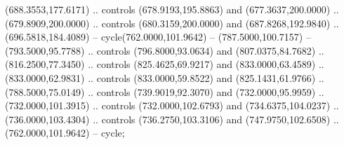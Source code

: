 (688.3553,177.6171) .. controls (678.9193,195.8863) and (677.3637,200.0000) .. (679.8909,200.0000) .. controls (680.3159,200.0000) and (687.8268,192.9840) .. (696.5818,184.4089) -- cycle(762.0000,101.9642) -- (787.5000,100.7157) -- (793.5000,95.7788) .. controls (796.8000,93.0634) and (807.0375,84.7682) .. (816.2500,77.3450) .. controls (825.4625,69.9217) and (833.0000,63.4589) .. (833.0000,62.9831) .. controls (833.0000,59.8522) and (825.1431,61.9766) .. (788.5000,75.0149) .. controls (739.9019,92.3070) and (732.0000,95.9959) .. (732.0000,101.3915) .. controls (732.0000,102.6793) and (734.6375,104.0237) .. (736.0000,103.4304) .. controls (736.2750,103.3106) and (747.9750,102.6508) .. (762.0000,101.9642) -- cycle;